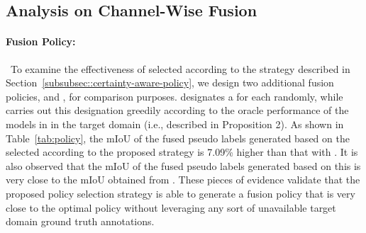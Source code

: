 \documentclass[final]{cvpr}
\begin{document}
\subsection{Analysis on Channel-Wise Fusion}
\label{sec:experiments:analysis}
\paragraph{Fusion Policy: }~To examine the effectiveness of  selected according to the strategy described in Section~\ref{subsubsec::certainty-aware-policy}, we design two additional fusion policies,  and , for comparison purposes.  designates a  for each  randomly, while  carries out this designation greedily according to the oracle performance of the models in  in the target domain (i.e.,  described in Proposition 2). As shown in Table~\ref{tab:policy}, the mIoU of the fused pseudo labels generated based on the  selected according to the proposed strategy is 7.09\% higher than that with . It is also observed that the mIoU of the fused pseudo labels generated based on this  is very close to the mIoU obtained from . These pieces of evidence validate that the proposed policy selection strategy is able to generate a fusion policy  that is very close to the optimal policy  without leveraging any sort of unavailable target domain ground truth annotations.
\end{document}
